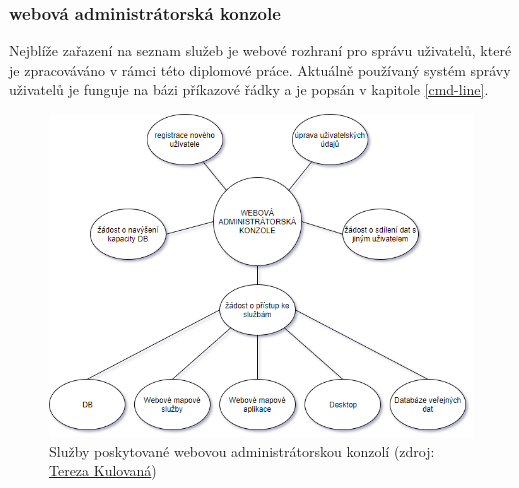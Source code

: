 \subsubsection{webová administrátorská konzole}

Nejblíže zařazení na seznam služeb je webové rozhraní pro správu
uživatelů, které je zpracováváno v rámci této diplomové
práce. Aktuálně používaný systém správy uživatelů je funguje na bázi
příkazové řádky a je popsán v kapitole \ref{cmd-line}.




\begin{figure}[H] \centering
    \includegraphics[width=350pt]{./pictures/console_services.png}
    \caption[Služby poskytované webovou administrátorskou konzolí]{Služby poskytované webovou administrátorskou konzolí (zdroj:
	\href{}{Tereza Kulovaná})}
    \label{fig:konzole-sluzby}
\end{figure}
